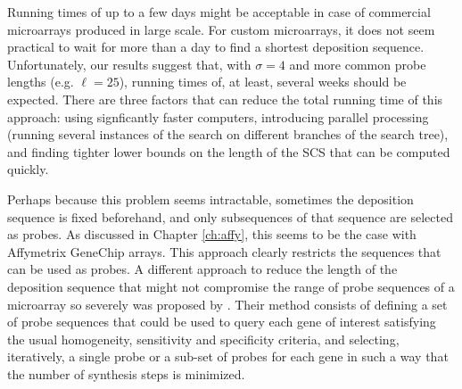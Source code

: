 Running times of up to a few days might be acceptable in case of commercial
microarrays produced in large scale. For custom microarrays, it does not seem
practical to wait for more than a day to find a shortest deposition sequence.
Unfortunately, our results suggest that, with $\sigma = 4$ and more common probe
lengths (e.g. $\ell = 25$), running times of, at least, several weeks should be
expected. There are three factors that can reduce the total running time of this
approach: using signficantly faster computers, introducing parallel processing
(running several instances of the search on different branches of the search
tree), and finding tighter lower bounds on the length of the SCS that can be
computed quickly.

Perhaps because this problem seems intractable, sometimes the deposition
sequence is fixed beforehand, and only subsequences of that sequence are
selected as probes. As discussed in Chapter \ref{ch:affy}, this seems to be the
case with Affymetrix GeneChip arrays. This approach clearly restricts the
sequences that can be used as probes. A different approach to reduce the length
of the deposition sequence that might not compromise the range of probe
sequences of a microarray so severely was proposed by \citet{Tolonen2002}. Their
method consists of defining a set of probe sequences that could be used to query
each gene of interest satisfying the usual homogeneity, sensitivity and
specificity criteria, and selecting, iteratively, a single probe or a sub-set of
probes for each gene in such a way that the number of synthesis steps is
minimized.
